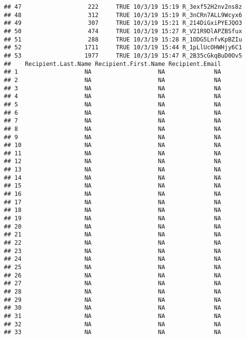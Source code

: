 \documentclass[]{article}
\begin{document}
\begin{verbatim}
## 47                   222     TRUE 10/3/19 15:19 R_3exf52H2nv2ns8z
## 48                   312     TRUE 10/3/19 15:19 R_3nCRn7ALL9Wcyx6
## 49                   307     TRUE 10/3/19 15:21 R_214DiGxiPYEJQO3
## 50                   474     TRUE 10/3/19 15:27 R_V21R9DlAPZBSfux
## 51                   288     TRUE 10/3/19 15:28 R_1ODG5LnfvKpBZIu
## 52                  1711     TRUE 10/3/19 15:44 R_1pLlUcOHWHjy6C1
## 53                  1977     TRUE 10/3/19 15:47 R_2B35cGkqBuD0Ov5
##    Recipient.Last.Name Recipient.First.Name Recipient.Email
## 1                   NA                   NA              NA
## 2                   NA                   NA              NA
## 3                   NA                   NA              NA
## 4                   NA                   NA              NA
## 5                   NA                   NA              NA
## 6                   NA                   NA              NA
## 7                   NA                   NA              NA
## 8                   NA                   NA              NA
## 9                   NA                   NA              NA
## 10                  NA                   NA              NA
## 11                  NA                   NA              NA
## 12                  NA                   NA              NA
## 13                  NA                   NA              NA
## 14                  NA                   NA              NA
## 15                  NA                   NA              NA
## 16                  NA                   NA              NA
## 17                  NA                   NA              NA
## 18                  NA                   NA              NA
## 19                  NA                   NA              NA
## 20                  NA                   NA              NA
## 21                  NA                   NA              NA
## 22                  NA                   NA              NA
## 23                  NA                   NA              NA
## 24                  NA                   NA              NA
## 25                  NA                   NA              NA
## 26                  NA                   NA              NA
## 27                  NA                   NA              NA
## 28                  NA                   NA              NA
## 29                  NA                   NA              NA
## 30                  NA                   NA              NA
## 31                  NA                   NA              NA
## 32                  NA                   NA              NA
## 33                  NA                   NA              NA

\end{verbatim}
\end{document}
